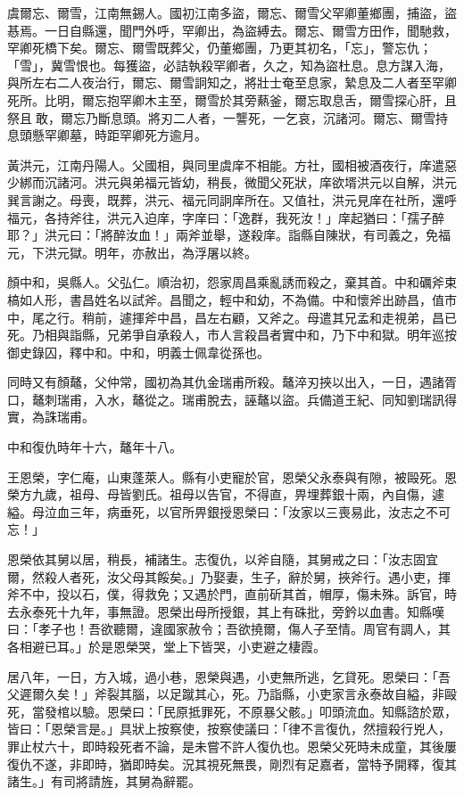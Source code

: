 \begin{pinyinscope}
虞爾忘、爾雪，江南無錫人。國初江南多盜，爾忘、爾雪父罕卿董鄉團，捕盜，盜惎焉。一日自縣還，聞門外呼，罕卿出，為盜縛去。爾忘、爾雪方田作，聞馳救，罕卿死橋下矣。爾忘、爾雪既葬父，仍董鄉團，乃更其初名，「忘」，警忘仇；「雪」，冀雪恨也。每獲盜，必詰執殺罕卿者，久之，知為盜杜息。息方謀入海，與所左右二人夜治行，爾忘、爾雪詗知之，將壯士奄至息家，縶息及二人者至罕卿死所。比明，爾忘抱罕卿木主至，爾雪於其旁爇釜，爾忘取息舌，爾雪探心肝，且祭且敢，爾忘乃斷息頭。將刃二人者，一讋死，一乞哀，沉諸河。爾忘、爾雪持息頭懸罕卿墓，時距罕卿死方逾月。

黃洪元，江南丹陽人。父國相，與同里虞庠不相能。方社，國相被酒夜行，庠遣惡少綁而沉諸河。洪元與弟福元皆幼，稍長，微聞父死狀，庠欲壻洪元以自解，洪元巽言謝之。母喪，既葬，洪元、福元同詗庠所在。又值社，洪元見庠在社所，還呼福元，各持斧往，洪元入迫庠，字庠曰：「逸群，我死汝！」庠起猶曰：「孺子醉耶？」洪元曰：「將醉汝血！」兩斧並舉，遂殺庠。詣縣自陳狀，有司義之，免福元，下洪元獄。明年，亦赦出，為浮屠以終。

顏中和，吳縣人。父弘仁。順治初，怨家周昌乘亂誘而殺之，棄其首。中和礪斧束槁如人形，書昌姓名以試斧。昌聞之，輕中和幼，不為備。中和懷斧出跡昌，值市中，尾之行。稍前，遽揮斧中昌，昌左右顧，又斧之。母遣其兄孟和走視弟，昌已死。乃相與詣縣，兄弟爭自承殺人，市人言殺昌者實中和，乃下中和獄。明年巡按御史錄囚，釋中和。中和，明義士佩韋從孫也。

同時又有顏鼇，父仲常，國初為其仇金瑞甫所殺。鼇淬刃挾以出入，一日，遇諸胥口，鼇刺瑞甫，入水，鼇從之。瑞甫脫去，誣鼇以盜。兵備道王紀、同知劉瑞訊得實，為誅瑞甫。

中和復仇時年十六，鼇年十八。

王恩榮，字仁庵，山東蓬萊人。縣有小吏寵於官，恩榮父永泰與有隙，被毆死。恩榮方九歲，祖母、母皆劉氏。祖母以告官，不得直，畀埋葬銀十兩，內自傷，遽縊。母泣血三年，病垂死，以官所畀銀授恩榮曰：「汝家以三喪易此，汝志之不可忘！」

恩榮依其舅以居，稍長，補諸生。志復仇，以斧自隨，其舅戒之曰：「汝志固宜爾，然殺人者死，汝父母其餒矣。」乃娶妻，生子，辭於舅，挾斧行。遇小吏，揮斧不中，投以石，僕，得救免；又遇於門，直前斫其首，帽厚，傷未殊。訴官，時去永泰死十九年，事無證。恩榮出母所授銀，其上有硃批，旁鈐以血書。知縣嘆曰：「孝子也！吾欲聽爾，違國家赦令；吾欲撓爾，傷人子至情。周官有調人，其各相避已耳。」於是恩榮哭，堂上下皆哭，小吏避之棲霞。

居八年，一日，方入城，過小巷，恩榮與遇，小吏無所逃，乞貸死。恩榮曰：「吾父遲爾久矣！」斧裂其腦，以足蹴其心，死。乃詣縣，小吏家言永泰故自縊，非毆死，當發棺以驗。恩榮曰：「民原抵罪死，不原暴父骸。」叩頭流血。知縣諮於眾，皆曰：「恩榮言是。」具狀上按察使，按察使議曰：「律不言復仇，然擅殺行兇人，罪止杖六十，即時殺死者不論，是未嘗不許人復仇也。恩榮父死時未成童，其後屢復仇不遂，非即時，猶即時矣。況其視死無畏，剛烈有足嘉者，當特予開釋，復其諸生。」有司將請旌，其舅為辭罷。


\end{pinyinscope}
